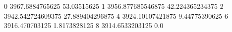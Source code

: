 0 3967.6884765625 53.03515625
1 3956.877685546875 42.224365234375
2 3942.542724609375 27.889404296875
4 3924.10107421875 9.44775390625
6 3916.470703125 1.8173828125
8 3914.6533203125 0.0
